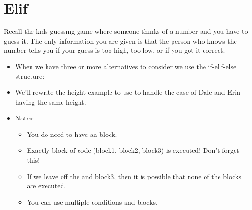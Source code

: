 \documentclass[letterpaper,10pt,english]{sphinxmanual}
\begin{document}
\section{Elif}
\label{\detokenize{lecture_notes/lec06_conditionals1:elif}}
Recall the kids guessing game where someone thinks of a number and you
have to guess it. The only information you are given is that the person
who knows the number tells you if your guess is too high, too low, or if
you got it correct.
\begin{itemize}
\item {} 
When we have three or more alternatives to consider we use the
if-elif-else structure:

\begin{sphinxVerbatim}[commandchars=\\\{\}]
 
 
\end{sphinxVerbatim}

\item {} 
We’ll rewrite the height example to use  to handle the case of Dale
and Erin having the same height.

\item {} 
Notes:
\begin{itemize}
\item {} 
You do  need to have an  block.

\item {} 
Exactly  block of code (block1, block2, block3) is
executed!  Don’t forget this!

\item {} 
If we leave off the  and block3, then it is possible that
none of the blocks are executed.

\item {} 
You can use multiple  conditions and blocks.

\end{itemize}

\end{itemize}
\end{document}
